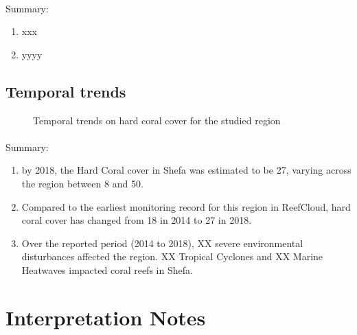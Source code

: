 \documentclass[
  letterpaper,
  DIV=11,
  numbers=noendperiod]{scrartcl}
\makeatletter
\let\oldparagraph\paragraph
\renewcommand{\paragraph}{
    \@ifstar
      \xxxParagraphStar
      \xxxParagraphNoStar
  }
\newcommand{\xxxParagraphStar}[1]{\oldparagraph*{#1}\mbox{}}
\newcommand{\xxxParagraphNoStar}[1]{\oldparagraph{#1}\mbox{}}
\providecommand{\tightlist}{%
  \setlength{\itemsep}{0pt}\setlength{\parskip}{0pt}}\usepackage{longtable,booktabs,array}
\makeatother
\begin{document}
\paragraph{Summary:}\label{summary-1}

\begin{enumerate}
\def\labelenumi{\arabic{enumi}.}
\tightlist
\item
  xxx
\item
  yyyy
\end{enumerate}

\pagebreak

\subsection{Temporal trends}\label{temporal-trends}

\begin{figure}[H]


\caption{\label{fig-temp_trend}Temporal trends on hard coral cover for
the studied region}

\end{figure}%

\paragraph{Summary:}\label{summary-2}

\begin{enumerate}
\def\labelenumi{\arabic{enumi}.}
\tightlist
\item
  by 2018, the Hard Coral cover in Shefa was estimated to be 27, varying
  across the region between 8 and 50.
\item
  Compared to the earliest monitoring record for this region in
  ReefCloud, hard coral cover has changed from 18 in 2014 to 27 in 2018.
\item
  Over the reported period (2014 to 2018), XX severe environmental
  disturbances affected the region. XX Tropical Cyclones and XX Marine
  Heatwaves impacted coral reefs in Shefa.
\end{enumerate}

\pagebreak

\section{Interpretation Notes}\label{interpretation-notes}
\end{document}

